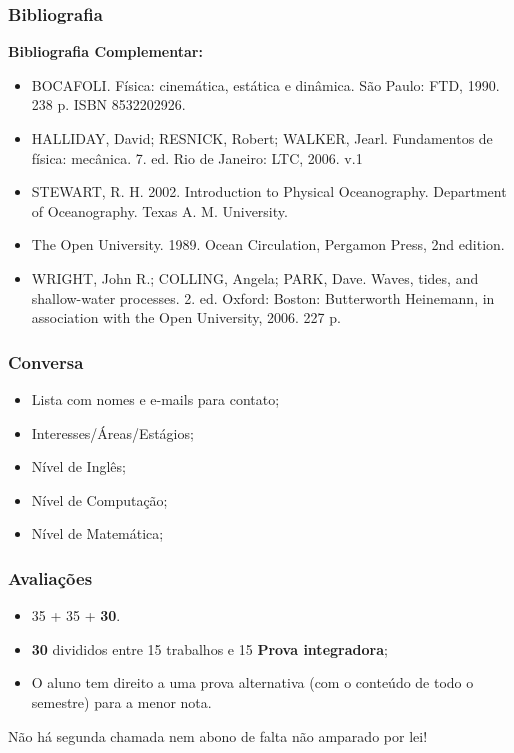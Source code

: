 \begin{frame}
    \frametitle{Bibliografia}
    {\scriptsize
    {\bf Bibliografia Complementar:}
    \begin{itemize}[<+-| alert@+>]
        \item BOCAFOLI. Física: cinemática, estática e dinâmica. São Paulo:
              FTD, 1990. 238 p. ISBN 8532202926.
        \item HALLIDAY, David; RESNICK, Robert; WALKER, Jearl. Fundamentos de
              física: mecânica. 7. ed. Rio de Janeiro: LTC, 2006. v.1
        \item STEWART, R. H. 2002. Introduction to Physical Oceanography.
              Department of Oceanography. Texas A. M. University.
        \item The Open University. 1989. Ocean Circulation, Pergamon Press,
              2nd edition.
        \item WRIGHT, John R.; COLLING, Angela; PARK, Dave. Waves, tides, and
              shallow-water processes. 2. ed. Oxford: Boston: Butterworth
              Heinemann, in association with the Open University, 2006. 227 p.
    \end{itemize}
    }
\end{frame}

\begin{frame}
    \frametitle{Conversa}
    \begin{itemize}
        \item Lista com nomes e e-mails para contato;
        \item Interesses/Áreas/Estágios;
        \item Nível de Inglês;
        \item Nível de Computação;
        \item Nível de Matemática;
    \end{itemize}
\end{frame}

\begin{frame}
    \frametitle{Avaliações}
    \begin{itemize}
        \item 35 + 35 + {\bf 30}.
        \item {\bf 30} divididos entre 15 trabalhos e 15 {\bf Prova integradora};
        \item O aluno tem direito a uma prova alternativa (com o conteúdo de
              todo o semestre) para a menor nota.
    \end{itemize}
    \begin{block}{}
    Não há segunda chamada{\bf *} nem abono{\bf *}
    de falta não amparado por lei!
    \end{block}
\end{frame}

